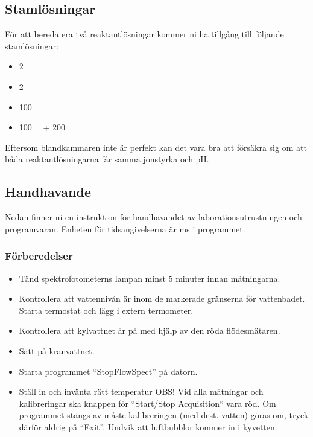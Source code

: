 \subsection{Stamlösningar}
För att bereda era två reaktantlösningar kommer ni ha tillgång till följande
stamlösningar:

\begin{itemize}
\item \SI{2}{\Molar} 
\item \SI{2}{\Molar} 
\item \SI{100}{\milli\Molar} 
\item \SI{100}{\milli\Molar}  + \SI{200}{\milli\Molar} 
\end{itemize}

Eftersom blandkammaren inte är perfekt kan det vara bra att försäkra sig
om att båda reaktantlösningarna får samma jonstyrka och pH.

\subsection{Handhavande}
\label{sec:handhavande}
Nedan finner ni en instruktion för handhavandet av
laborationsutrustningen och programvaran. Enheten för tidsangivelserna är
\si{\milli\second} i programmet.

\subsubsection{Förberedelser}
\begin{itemize}
\item Tänd spektrofotometerns lampan minst 5 minuter innan mätningarna.
\item Kontrollera att vattennivån är inom de markerade gränserna för vattenbadet.
Starta termostat och lägg i extern termometer.
\item Kontrollera att kylvattnet är på med hjälp av den röda flödesmätaren.
\item Sätt på kranvattnet.
\item Starta programmet ``StopFlowSpect'' på datorn.
\item Ställ in och invänta rätt temperatur OBS! Vid alla mätningar och
  kalibreringar ska knappen för ``Start/Stop Acquisition`` vara röd. Om
  programmet stängs av måste kalibreringen (med dest. vatten) göras om,
  tryck därför aldrig på ``Exit''. Undvik att luftbubblor kommer in i
  kyvetten.
\end{itemize}
